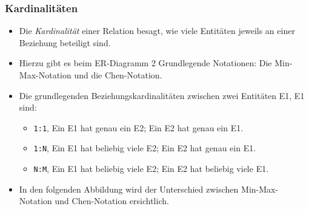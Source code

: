 \documentclass[a4paper, 11pt, accentcolor = tud3b]{tudreport}
\begin{document}
                \subsubsection{Kardinalitäten} %
                    \begin{itemize}
                    	\item Die \textit{Kardinalität} einer Relation besagt, wie viele Entitäten jeweils an einer Beziehung beteiligt sind.
                    	\item Hierzu gibt es beim ER-Diagramm 2 Grundlegende Notationen: Die Min-Max-Notation und die Chen-Notation.
                    	\item Die grundlegenden Beziehungskardinalitäten zwischen zwei Entitäten E1, E1 sind:
                    		\begin{itemize}
                    			\item \texttt{1:1}, Ein E1 hat genau ein E2; Ein E2 hat genau ein E1.
                    			\item \texttt{1:N}, Ein E1 hat beliebig viele E2; Ein E2 hat genau ein E1.
                    			\item \texttt{N:M}, Ein E1 hat beliebig viele E2; Ein E2 hat beliebig viele E1.
                    		\end{itemize}
                    	\item In den folgenden Abbildung wird der Unterschied zwischen \textcolor{tud4c}{Min-Max-Notation} und \textcolor{tud1b}{Chen-Notation} ersichtlich.
                    \end{itemize}
                
\end{document}
